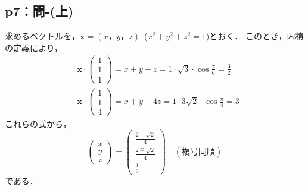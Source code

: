 \documentclass[uplatex,dvipdfmx,a4paper,10pt,fleqn]{jsarticle}
\begin{document}
\newpage

\subsection*{p7：問-(上)}

\begin{tleftbar}
    求めるベクトルを，$\bm{x}=(x，y，z)$~($x^2+y^2 +z^2=1$)とおく．
    このとき，内積の定義により，
    \begin{align*}
        &\bm{x} \cdot 
        \begin{pmatrix}
                1 \\
                1 \\
                1
            \end{pmatrix}
        =x+y+z= 1 \cdot \sqrt{3} \cdot \cos \frac{\pi}{6} =\frac{3}{2} \\
        &\bm{x} \cdot 
            \begin{pmatrix}
                1 \\
                1 \\
                4
            \end{pmatrix}
        =x+y+4z= 1 \cdot 3\sqrt{2} \cdot \cos \frac{\pi}{4} =3
        \end{align*}
        これらの式から，
        \begin{equation*}
            \begin{pmatrix}
            x \\
            y \\
            z  
    \end{pmatrix}
    =
                \begin{pmatrix}
                \frac{2 \pm \sqrt{2}}{4} \\
                \frac{2 \mp \sqrt{2}}{4} \\
                \frac{1}{2} 
    \end{pmatrix}
            \quad (\text{複号同順})
    \end{equation*}
        である．
    \end{tleftbar}
\end{document}
